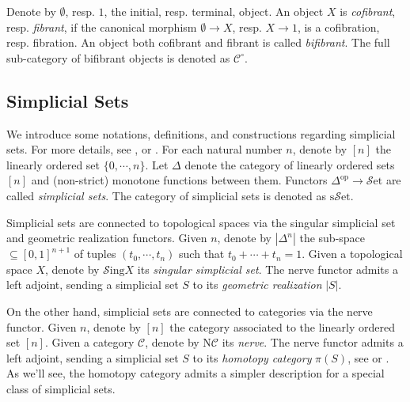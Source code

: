 \documentclass[a4paper]{book}
\newcommand{\lC}{\mathcal{C}}
\newcommand{\mN}{\mathrm{N}}
\newcommand{\lS}{\mathcal{S}}
\newcommand{\op}{\mathrm{op}}
\newcommand{\set}{\lS\mathrm{et}} %
\newcommand{\sset}{\mathrm{s}\set} %
\newcommand{\Sing}{\lS\mathrm{ing}} %
\theoremstyle{definition}
\theoremstyle{remark}
\numberwithin{equation}{section}
\begin{document}
Denote by $\emptyset$, resp. $1$, the initial, resp. terminal, object. An object $X$ is \emph{cofibrant}, resp. \emph{fibrant}, if the canonical morphism $\emptyset\to X$, resp. $X\to1$, is a cofibration, resp. fibration. An object both cofibrant and fibrant is called \emph{bifibrant}. The full sub-category of bifibrant objects is denoted as $\lC^\circ$. 

\subsection{Simplicial Sets}

We introduce some notations, definitions, and constructions regarding simplicial sets. For more details, see \cite{hovey1999modelcategories,goerssjardine1999simplicialhomotopytheory}, or \cite[Tag 0004]{kerodon2026}. For each natural number $n$, denote by $[n]$ the linearly ordered set $\{0,\cdots,n\}$. Let $\Delta$ denote the category of linearly ordered sets $[n]$ and (non-strict) monotone functions between them. Functors $\Delta^\op\to\set$ are called \emph{simplicial sets}. The category of simplicial sets is denoted as $\sset$. 

Simplicial sets are connected to topological spaces via the singular simplicial set and geometric realization functors. Given $n$, denote by $|\Delta^n|$ the sub-space $\subseteq[0,1]^{n+1}$ of tuples $(t_0,\cdots,t_n)$ such that $t_0+\cdots+t_n=1$. Given a topological space $X$, denote by $\Sing X$ its \emph{singular simplicial set}. The nerve functor admits a left adjoint, sending a simplicial set $S$ to its \emph{geometric realization} $|S|$.

On the other hand, simplicial sets are connected to categories via the nerve functor. Given $n$, denote by $[n]$ the category associated to the linearly ordered set $[n]$. Given a category $\lC$, denote by $\mN\lC$ its \emph{nerve}. The nerve functor admits a left adjoint, sending a simplicial set $S$ to its \emph{homotopy category} $\pi(S)$, see \cite[Definition 1.2.5]{land2021introduction} or \cite[Tag 004M]{kerodon2026}. As we'll see, the homotopy category admits a simpler description for a special class of simplicial sets. 
\end{document}
